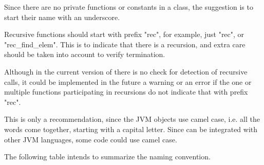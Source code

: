 Since there are no private functions or constants in a class, the suggestion is to start their name with an underscore.

Recursive functions should start with prefix "rec", for example, just "rec", or "rec_find_elem".
This is to indicate that there is a recursion, and extra care should be taken into account to verify termination.

Although in the current version of \Soda there is no check for detection of recursive calls, it could be implemented in the future a warning or an error if the one or multiple functions participating in recursions do not indicate that with prefix "rec".

This is only a recommendation, since the JVM objects use camel case, i.e. all the words come together, starting with a capital letter.
Since \Soda can be integrated with other JVM languages, some \Soda code could use camel case.

The following table intends to summarize the naming convention.

